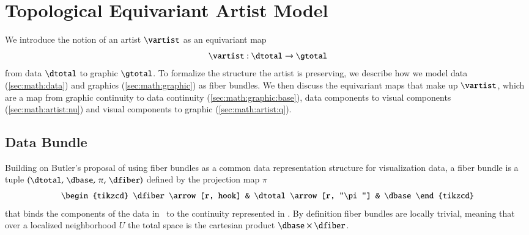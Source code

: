 \documentclass[journal]{vgtc}                %
\begin{document}
\section{Topological Equivariant Artist Model}
\label{sec:math}
We introduce the notion of an artist $\mathscr{\vartist}$ as an equivariant map
\begin{equation}
    \label{eq:artist}
    \mathscr{\vartist}: \mathscr{\dtotal} \rightarrow \mathscr{\gtotal}
\end{equation}
from data $\mathscr{\dtotal}$ to graphic $\mathscr{\gtotal}$. To formalize the structure the artist is preserving, we describe how we model data (\autoref{sec:math:data}) and graphics (\autoref{sec:math:graphic}) as fiber bundles. We then discuss the equivariant maps that make up $\mathscr{\vartist}$, which are a map from  graphic continuity to data continuity (\autoref{sec:math:graphic:base}), data components to visual components (\autoref{sec:math:artist:nu}) and visual components to graphic (\autoref{sec:math:artist:q}).


\subsection{Data Bundle}
\label{sec:math:data}
Building on Butler's proposal of using fiber bundles as a common data representation structure for visualization data\cite{butlerVectorBundleClassesForm1992, butlerVisualizationModelBased1989}, a fiber bundle is a tuple $(\dtotal,\,\dbase,\,\pi ,\,\dfiber)$ defined by the projection map $\pi$
\begin{equation}
    \label{eq:fiber_bundle}
    \begin{tikzcd}
        \dfiber \arrow[r, hook] & \dtotal \arrow[r, "\pi"] & \dbase
    \end{tikzcd}
\end{equation}
that binds the components of the data in \dfiber\ to the continuity represented in \dbase. By definition fiber bundles are locally trivial\cite{spanier1989algebraic,LocallyTrivialFibre}, meaning that over a localized neighborhood $U$ the total space is the cartesian product $\dbase\times\dfiber$. 
\end{document}
